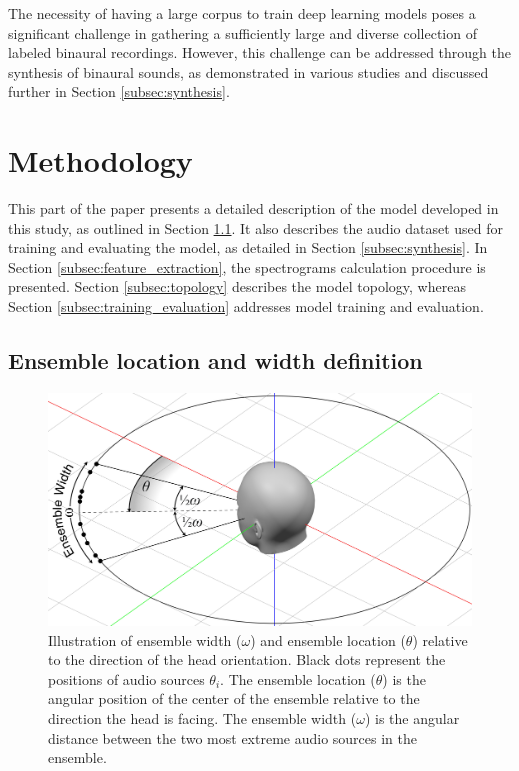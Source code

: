 \documentclass[11pt]{article}
\begin{document}
The necessity of having a large corpus to train deep learning models poses a significant challenge in gathering a sufficiently large and diverse collection of labeled binaural recordings. However, this challenge can be addressed through the synthesis of binaural sounds, as demonstrated in various studies \parencite{antoniuk_blind_2023, zielinski_automatic_2022, zielinski_spatial_2022, zielinski_comparison_2020, yang_deepear_2022, ma_robust_2018} and discussed further in Section \ref{subsec:synthesis}.

\section{Methodology}
\label{sec:methodology}

This part of the paper presents a detailed description of the model developed in this study, as outlined in Section \ref{subsec:ensemble_definition}. It also describes the audio dataset used for training and evaluating the model, as detailed in Section \ref{subsec:synthesis}. In Section \ref{subsec:feature_extraction}, the spectrograms calculation procedure is presented. Section \ref{subsec:topology} describes the model topology, whereas Section \ref{subsec:training_evaluation} addresses model training and evaluation.

\subsection{Ensemble location and width definition}
\label{subsec:ensemble_definition}

\begin{figure}[ht!]
  \centering
  \includegraphics[width=\linewidth]{../pictures/scene2.pdf}
  \caption{\label{fig:scene}Illustration of ensemble width ($\omega$) and ensemble location ($\theta$) relative to the direction of the head orientation. Black dots represent the positions of audio sources $\theta_i$. The ensemble location ($\theta$) is the angular position of the center of the ensemble relative to the direction the head is facing. The ensemble width ($\omega$) is the angular distance between the two most extreme audio sources in the ensemble.}
\end{figure}
\end{document}
